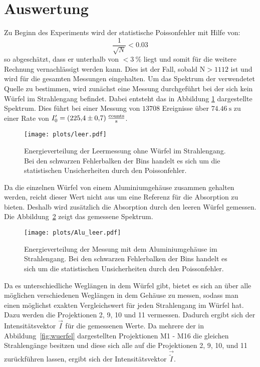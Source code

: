 \section{Auswertung}
Zu Beginn des Experiments wird der statistische Poissonfehler mit Hilfe von:
\begin{equation*}
  \frac{1}{\sqrt{N}} < \num{0.03}
\end{equation*}
so abgeschätzt, dass er unterhalb von $<\SI{3}{\percent}$ liegt und somit für die weitere
Rechnung vernachlässigt werden kann. Dies ist der Fall, sobald $\text{N}>1112$
ist und wird für die gesamten Messungen eingehalten. Um das Spektrum der verwendetet
Quelle zu bestimmen, wird zunächst eine Messung durchgeführt bei der sich kein Würfel
im Strahlengang befindet. Dabei entsteht das in Abbildung \ref{fig:leer} dargestellte Spektrum.
Dies führt bei einer Messung von $13708$ Ereignisse über $\SI{74.46}{\second}$ zu einer
Rate von $I'_0 = (\num{225.4\pm 0.7})\:\frac{\text{counts}}{\text{s}}$.

\begin{figure}
  \centering
  \texttt{[image: plots/leer.pdf]}
  \caption{Energieverteilung der Leermessung ohne Würfel im Strahlengang. Bei den schwarzen Fehlerbalken der Bins handelt es sich um die statistischen Unsicherheiten durch den Poissonfehler.}
  \label{fig:leer}
\end{figure}

Da die einzelnen Würfel von einem Aluminiumgehäuse zusammen gehalten werden, reicht dieser Wert nicht aus um
eine Referenz für die Absorption zu bieten. Deshalb wird zusätzlich die Absorption durch den leeren Würfel gemessen.
Die Abbildung~\ref{fig:alu} zeigt das gemessene Spektrum.

\begin{figure}
  \centering
  \texttt{[image: plots/Alu\_leer.pdf]}
  \caption{Energieverteilung der Messung mit dem Aluminiumgehäuse im Strahlengang.
  Bei den schwarzen Fehlerbalken der Bins handelt es sich um die statistischen Unsicherheiten durch den Poissonfehler.}
  \label{fig:alu}
\end{figure}

Da es unterschiedliche Weglängen in dem Würfel gibt, bietet es sich an über alle möglichen verschiedenen
Weglängen in dem Gehäuse zu messen, sodass man einen möglichst exakten Vergleichswert für jeden Strahlengang
im Würfel hat. Dazu werden die Projektionen 2, 9, 10 und 11 vermessen. Dadurch ergibt sich der Intensitätsvektor $\vec{I}$
für die gemessenen Werte. Da mehrere der in Abbildung~\ref{fig:wuerfel} dargestellten Projektionen M1 - M16 die gleichen Strahlengänge
besitzen und diese sich alle auf die Projektionen 2, 9, 10, und 11 zurückführen lassen, ergibt sich der Intensitätsvektor $\vec{\tilde{I}}$.

